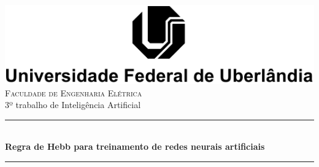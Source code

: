 \documentclass[11pt]{article}
\begin{document}
\begin{titlepage}

\newcommand{\HRule}{\rule{\linewidth}{0.5mm}} %

\center %


\includegraphics[scale=1.2]{ufulogo4}\\[1cm] %
 


\textsc{\Large Faculdade de Engenharia Elétrica}\\[0.6cm] %
{\large 3º trabalho de Inteligência Artificial}\\[0.5cm] %


\HRule \\[0.4cm]
{ \huge \bfseries Regra de Hebb para treinamento de redes neurais artificiais}\\[0.4cm] %
\HRule \\[1.5cm]
 


\end{titlepage}
\end{document}
